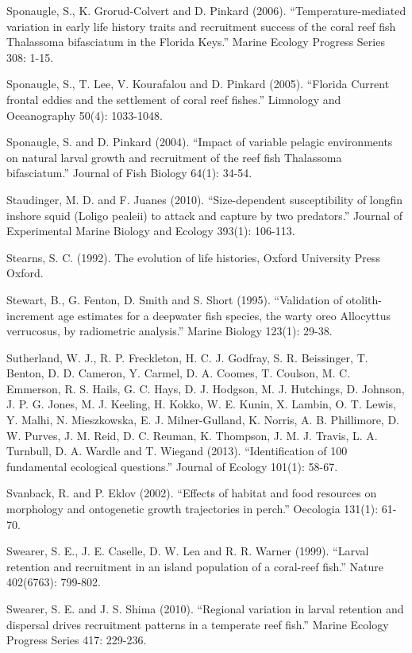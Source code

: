 \documentclass[]{book}
\begin{document}
Sponaugle, S., K. Grorud-Colvert and D. Pinkard (2006).
``Temperature-mediated variation in early life history traits and
recruitment success of the coral reef fish Thalassoma bifasciatum in the
Florida Keys.'' Marine Ecology Progress Series 308: 1-15.

Sponaugle, S., T. Lee, V. Kourafalou and D. Pinkard (2005). ``Florida
Current frontal eddies and the settlement of coral reef fishes.''
Limnology and Oceanography 50(4): 1033-1048.

Sponaugle, S. and D. Pinkard (2004). ``Impact of variable pelagic
environments on natural larval growth and recruitment of the reef fish
Thalassoma bifasciatum.'' Journal of Fish Biology 64(1): 34-54.

Staudinger, M. D. and F. Juanes (2010). ``Size-dependent susceptibility
of longfin inshore squid (Loligo pealeii) to attack and capture by two
predators.'' Journal of Experimental Marine Biology and Ecology 393(1):
106-113.

Stearns, S. C. (1992). The evolution of life histories, Oxford
University Press Oxford.

Stewart, B., G. Fenton, D. Smith and S. Short (1995). ``Validation of
otolith-increment age estimates for a deepwater fish species, the warty
oreo Allocyttus verrucosus, by radiometric analysis.'' Marine Biology
123(1): 29-38.

Sutherland, W. J., R. P. Freckleton, H. C. J. Godfray, S. R. Beissinger,
T. Benton, D. D. Cameron, Y. Carmel, D. A. Coomes, T. Coulson, M. C.
Emmerson, R. S. Hails, G. C. Hays, D. J. Hodgson, M. J. Hutchings, D.
Johnson, J. P. G. Jones, M. J. Keeling, H. Kokko, W. E. Kunin, X.
Lambin, O. T. Lewis, Y. Malhi, N. Mieszkowska, E. J. Milner-Gulland, K.
Norris, A. B. Phillimore, D. W. Purves, J. M. Reid, D. C. Reuman, K.
Thompson, J. M. J. Travis, L. A. Turnbull, D. A. Wardle and T. Wiegand
(2013). ``Identification of 100 fundamental ecological questions.''
Journal of Ecology 101(1): 58-67.

Svanback, R. and P. Eklov (2002). ``Effects of habitat and food
resources on morphology and ontogenetic growth trajectories in perch.''
Oecologia 131(1): 61-70.

Swearer, S. E., J. E. Caselle, D. W. Lea and R. R. Warner (1999).
``Larval retention and recruitment in an island population of a
coral-reef fish.'' Nature 402(6763): 799-802.

Swearer, S. E. and J. S. Shima (2010). ``Regional variation in larval
retention and dispersal drives recruitment patterns in a temperate reef
fish.'' Marine Ecology Progress Series 417: 229-236.
\end{document}
